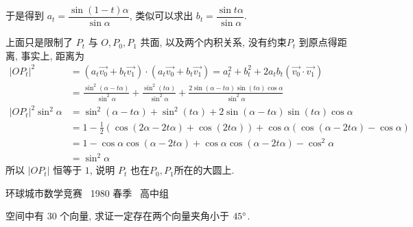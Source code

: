 于是得到 $a_t = \dfrac{\sin(1-t)\alpha}{\sin\alpha}$, 类似可以求出 $b_t = \dfrac{\sin t\alpha}{\sin\alpha}$. 

上面只是限制了 $P_t$ 与 $O, P_0, P_1$ 共面, 以及两个内积关系, 没有约束$P_t$ 到原点得距离, 事实上, 距离为
\begin{align*}
|OP_t|^2 &= (a_t \vec{v_0} + b_t \vec{v_1})\cdot(a_t \vec{v_0} + b_t \vec{v_1}) = a_t^2 + b_t^2 + 2a_tb_t(\vec{v_0}\cdot\vec{v_1})\\ 
&= \frac{\sin^2(\alpha - t\alpha)}{\sin^2\alpha} + \frac{\sin^2(t\alpha)}{\sin^2\alpha} + \frac{2\sin(\alpha - t\alpha)\sin(t\alpha)\cos\alpha}{\sin^2\alpha}\\
|OP_t|^2 \sin^2\alpha &= \sin^2(\alpha - t\alpha) + \sin^2(t\alpha) + 2\sin(\alpha - t\alpha)\sin(t\alpha)\cos\alpha\\
&= 1-\frac{1}{2}(\cos(2\alpha - 2t\alpha) + \cos(2t\alpha)) + \cos\alpha(\cos(\alpha - 2t\alpha) - \cos\alpha)\\
&= 1 - \cos\alpha\cos(\alpha - 2t\alpha) + \cos\alpha\cos(\alpha-2t\alpha) - \cos^2\alpha\\
&= \sin^2\alpha
\end{align*}
所以 $|OP_t|$ 恒等于 $1$, 说明 $P_t$ 也在$P_0, P_1$所在的大圆上.

\newpage

\noindent 环球城市数学竞赛~ 1980 春季~ 高中组

空间中有 30 个向量, 求证一定存在两个向量夹角小于 $ 45 \degree $.

